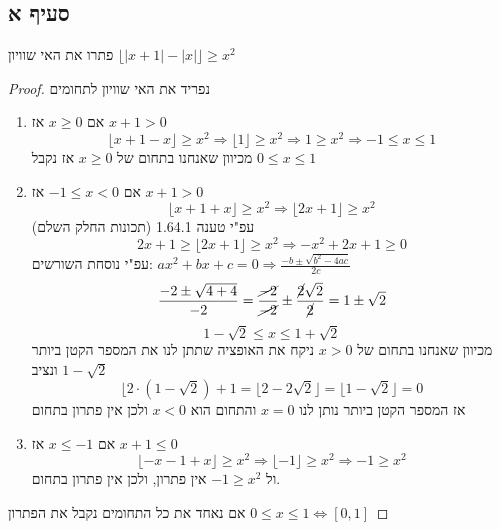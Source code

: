 \documentclass{article}
\begin{document}
	\subsection*{סעיף א}
	פתרו את האי שוויון
	$\lfloor |x+1| - |x| \rfloor \geq x^2$
	\begin{proof}
		נפריד את האי שוויון לתחומים
		\begin{enumerate}[I]
			\item אם $x \geq 0$ אז $x + 1 > 0$
			\[
				\lfloor x + 1 - x \rfloor \geq x^2 \Rightarrow
				\lfloor 1 \rfloor \geq x^2 \Rightarrow
				1 \geq x^2 \Rightarrow
				-1 \leq x \leq 1
			\]
				מכיוון שאנחנו בתחום של $x \geq 0$ אז נקבל $0 \leq x \leq 1$
			\item אם $-1 \leq x < 0$ אז $x+1 > 0$
			\[
				\lfloor x + 1 + x \rfloor \geq x^2 \Rightarrow
				\lfloor 2x+1 \rfloor \geq x^2
			\]
			עפ"י טענה 1.64.1 (תכונות החלק השלם)
			\[
				2x + 1 \geq \lfloor 2x + 1 \rfloor \geq x^2 \Rightarrow
				-x^2 + 2x + 1 \geq 0
			\]
			עפ"י נוסחת השורשים:
			$ax^2 + bx + c = 0 \Rightarrow \frac{-b \pm \sqrt{b^2 -4ac}}{2c}$
			\[
			\frac{-2 \pm \sqrt{4+4}}{-2} =
			\frac{\cancel{-2}}{\cancel{-2}} \pm \frac{\cancel{2}\sqrt{2}}{\cancel{2}} =
			1 \pm \sqrt{2}
			 \]
			 \[ 1 - \sqrt{2} \leq x \leq 1 + \sqrt{2} \]
			 מכיוון שאנחנו בתחום של $x > 0$ ניקח את האופציה שתתן לנו את המספר הקטן ביותר $1 - \sqrt{2}$ ונציב
			 \[
			 	\lfloor2 \cdot (1 - \sqrt{2}) + 1 = \lfloor 2 - 2\sqrt{2} \rfloor = \lfloor 1 - \sqrt{2} \rfloor = 0
			 \]
 			 אז המספר הקטן ביותר נותן לנו $x=0$ והתחום הוא $x<0$ ולכן אין פתרון בתחום
 			 \item אם $x \leq -1$ אז $x + 1 \leq 0$
 			 \[
 			 	\lfloor -x -1 +x \rfloor \geq x^2 \Rightarrow
 			 	\lfloor -1 \rfloor \geq x^2 \Rightarrow
 			 	-1 \geq x^2
 			 \]
 			 ול $-1 \geq x^2 $ אין פתרון, ולכן אין פתרון בתחום.
		\end{enumerate}
	אם נאחד את כל התחומים נקבל את הפתרון
	$0 \leq x \leq 1 \iff [0,1]$
	\end{proof}

	\pagebreak
\end{document}
